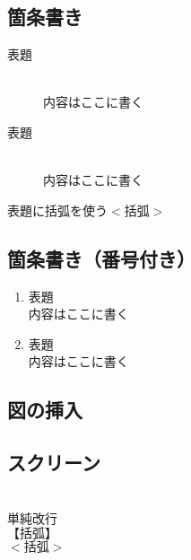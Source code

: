 \documentclass[a4j]{jarticle}
\begin{document}
\subsection{箇条書き}
\begin{description}
\item [表題]~\\
内容はここに書く
\item[表題]\mbox{}\\
内容はここに書く
\item[表題に括弧を使う$<$括弧$>$]
\end{description}

\subsection{箇条書き（番号付き）}
\begin{enumerate}
\item 表題　~\\
内容はここに書く 
\item 表題　\mbox{}\\
内容はここに書く 
\end{enumerate}

\subsection{図の挿入}

\subsection{スクリーン}
\begin{screen}
~\\
単純改行\\
$【括弧】$\\
$<括弧>$ \\
\end{screen}
\end{document}
